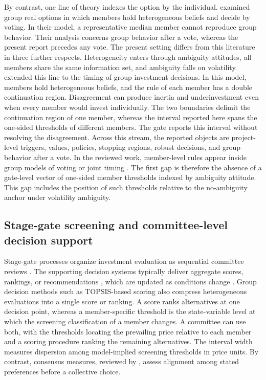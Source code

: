\documentclass[5p,times,authoryear]{elsarticle}
\theoremstyle{plain}
\begin{document}
By contrast, one line of theory indexes the option by the individual. \citet{Garlappi2017,Garlappi2022} examined group real options in which members hold heterogeneous beliefs and decide by voting. In their model, a representative median member cannot reproduce group behavior. Their analysis concerns group behavior after a vote, whereas the present report precedes any vote. The present setting differs from this literature in three further respects. Heterogeneity enters through ambiguity attitudes, all members share the same information set, and ambiguity falls on volatility. \citet{Cardenas2025} extended this line to the timing of group investment decisions. In this model, members hold heterogeneous beliefs, and the rule of each member has a double continuation region. Disagreement can produce inertia and underinvestment even when every member would invest individually. The two boundaries delimit the continuation region of one member, whereas the interval reported here spans the one-sided thresholds of different members. The gate reports this interval without resolving the disagreement. Across this stream, the reported objects are project-level triggers, values, policies, stopping regions, robust decisions, and group behavior after a vote. In the reviewed work, member-level rules appear inside group models of voting or joint timing \citep{Garlappi2017,Cardenas2025}. The first gap is therefore the absence of a gate-level vector of one-sided member thresholds indexed by ambiguity attitude. This gap includes the position of such thresholds relative to the no-ambiguity anchor under volatility ambiguity.

\subsection{Stage-gate screening and committee-level decision support}

Stage-gate processes organize investment evaluation as sequential committee reviews \citep{Cooper2008}. The supporting decision systems typically deliver aggregate scores, rankings, or recommendations \citep{Sprague1980,Power2002}, which are updated as conditions change \citep{Violos2025}. Group decision methods such as TOPSIS-based scoring \citep{HwangYoon1981} also compress heterogeneous evaluations into a single score or ranking. A score ranks alternatives at one decision point, whereas a member-specific threshold is the state-variable level at which the screening classification of a member changes. A committee can use both, with the thresholds locating the prevailing price relative to each member and a scoring procedure ranking the remaining alternatives. The interval width measures dispersion among model-implied screening thresholds in price units. By contrast, consensus measures, reviewed by \citet{HerreraViedma2014}, assess alignment among stated preferences before a collective choice.
\end{document}
